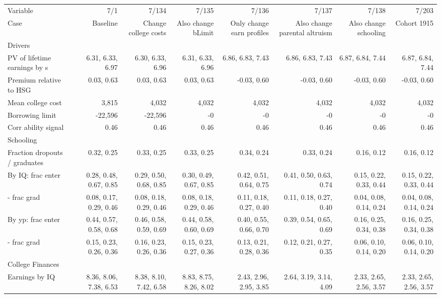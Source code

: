 \begin{tabular}{lrrrrrrr}
\hline
Variable & 7/1  & 7/134  & 7/135  & 7/136  & 7/137  & 7/138  & 7/203  \\
Case & Baseline  & Change college costs  & Also change bLimit  & Only change earn profiles  & Also change parental altruism  & Also change schooling  & Cohort 1915  \\
Drivers &   &   &   &   &   &   &   \\
PV of lifetime earnings by s & 6.31, 6.33, 6.97  & 6.30, 6.33, 6.96  & 6.31, 6.33, 6.96  & 6.86, 6.83, 7.43  & 6.86, 6.83, 7.43  & 6.87, 6.84, 7.44  & 6.87, 6.84, 7.44  \\
Premium relative to HSG & 0.03, 0.63  & 0.03, 0.63  & 0.03, 0.63  & -0.03, 0.60  & -0.03, 0.60  & -0.03, 0.60  & -0.03, 0.60  \\
Mean college cost & 3,815  & 4,032  & 4,032  & 4,032  & 4,032  & 4,032  & 4,032  \\
Borrowing limit & -22,596  & -22,596  & -0  & -0  & -0  & -0  & -0  \\
Corr ability signal & 0.46  & 0.46  & 0.46  & 0.46  & 0.46  & 0.46  & 0.46  \\
\hline
Schooling &   &   &   &   &   &   &   \\
Fraction dropouts / graduates & 0.32, 0.25  & 0.33, 0.25  & 0.33, 0.25  & 0.34, 0.24  & 0.33, 0.24  & 0.16, 0.12  & 0.16, 0.12  \\
By IQ: frac enter & 0.28, 0.48, 0.67, 0.85  & 0.29, 0.50, 0.68, 0.85  & 0.30, 0.49, 0.67, 0.85  & 0.42, 0.51, 0.64, 0.75  & 0.41, 0.50, 0.63, 0.74  & 0.15, 0.22, 0.33, 0.44  & 0.15, 0.22, 0.33, 0.44  \\
- frac grad & 0.08, 0.17, 0.29, 0.46  & 0.08, 0.18, 0.29, 0.46  & 0.08, 0.18, 0.29, 0.46  & 0.11, 0.18, 0.27, 0.40  & 0.11, 0.18, 0.27, 0.40  & 0.04, 0.08, 0.14, 0.24  & 0.04, 0.08, 0.14, 0.24  \\
By yp: frac enter & 0.44, 0.57, 0.58, 0.68  & 0.46, 0.58, 0.59, 0.69  & 0.44, 0.58, 0.60, 0.69  & 0.40, 0.55, 0.66, 0.70  & 0.39, 0.54, 0.65, 0.69  & 0.16, 0.25, 0.34, 0.38  & 0.16, 0.25, 0.34, 0.38  \\
- frac grad & 0.15, 0.23, 0.26, 0.36  & 0.16, 0.23, 0.26, 0.36  & 0.15, 0.23, 0.27, 0.36  & 0.13, 0.21, 0.28, 0.36  & 0.12, 0.21, 0.27, 0.35  & 0.06, 0.10, 0.14, 0.20  & 0.06, 0.10, 0.14, 0.20  \\
\hline
College Finances &   &   &   &   &   &   &   \\
Earnings by IQ & 8.36, 8.06, 7.38, 6.53  & 8.38, 8.10, 7.42, 6.58  & 8.83, 8.75, 8.26, 8.02  & 2.43, 2.96, 2.95, 3.85  & 2.64, 3.19, 3.14, 4.09  & 2.33, 2.65, 2.56, 3.57  & 2.33, 2.65, 2.56, 3.57  \\

\end{tabular}
